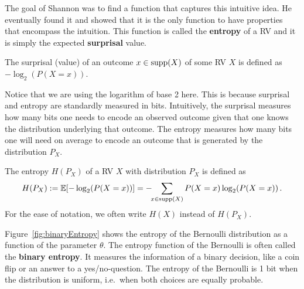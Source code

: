 The goal of Shannon was to find a function that captures this intuitive idea. He eventually found it and showed that it is the only function to have properties
that encompass the intuition. This function is called the \textbf{entropy} of a RV and it is simply the expected \textbf{surprisal} value.

\begin{Definition}[Surprisal]
The surprisal (value) of an outcome $ x \in \operatorname{supp}(X) $ of some RV $ X $ is defined as $ -\log_{2}(P(X=x))$.
\end{Definition} 

Notice that we are using the logarithm of base 2 here. This is because surprisal and entropy are standardly measured in bits. Intuitively, the surprisal measures
how many bits one needs to encode an observed outcome given that one knows the distribution underlying that outcome. The entropy measures how many bits one
will need on average to encode an outcome that is generated by the distribution $ P_{X} $.

\begin{Definition}[Entropy]
The entropy $H(P_X)$ of a RV $ X $ with distribution $P_X$ is defined as 
$$H(P_X) := \mathbb{E}[-\log_{2}(P(X=x))] = - \!\! \sum_{x \in \operatorname{supp}(X)} P(X=x) \log_2(P(X=x)) \, .$$ 
For the ease of notation, we often write $H(X)$ instead of $H(P_X)$.
\end{Definition}

Figure~\ref{fig:binaryEntropy} shows the entropy of the Bernoulli distribution as a function of the
parameter $ \theta $. The entropy function of the Bernoulli is often called the \textbf{binary entropy}.
It measures the information of a binary decision, like a coin flip or an answer to a yes/no-question.
The entropy of the Bernoulli is 1 bit when the distribution is uniform, i.e.\ when both choices are equally 
probable. 

